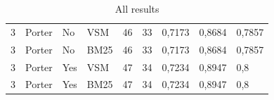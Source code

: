 \begin{table}[h]
{\begin{tabular}{lllllllll}
\rowcolor[HTML]{9B9B9B} 
3                                   & Porter                         & No                               & VSM                             & 46                               & 33                              & 0,7173                           & 0,8684                        & 0,7857                         \\
\rowcolor[HTML]{9B9B9B} 
3                                   & Porter                         & No                               & BM25                            & 46                               & 33                              & 0,7173                           & 0,8684                        & 0,7857                         \\
\rowcolor[HTML]{9B9B9B} 
3                                   & Porter                         & Yes                              & VSM                             & 47                               & 34                              & 0,7234                           & 0,8947                        & 0,8                            \\
\rowcolor[HTML]{9B9B9B} 
3                                   & Porter                         & Yes                              & BM25                            & 47                               & 34                              & 0,7234                           & 0,8947                        & 0,8                           
\end{tabular}}
\caption{All results}
\label{fig:table}
\end{table}

\FloatBarrier



